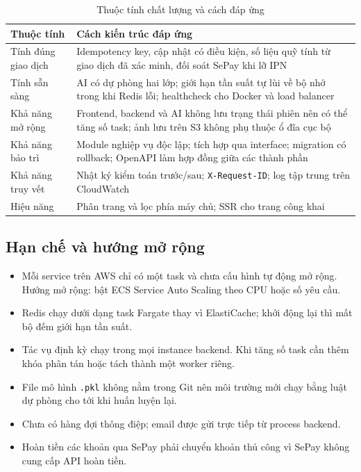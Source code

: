 \begin{table}[htbp]
    \centering
    \small
    \caption{Thuộc tính chất lượng và cách đáp ứng}
    \label{tab:chat_luong}
    \begin{tabularx}{\textwidth}{|P{3.4cm}|X|}
        \hline
        \textbf{Thuộc tính} & \textbf{Cách kiến trúc đáp ứng} \\
        \hline
        Tính đúng giao dịch & Idempotency key, cập nhật có điều kiện, số liệu quỹ tính từ giao dịch đã xác minh, đối soát SePay khi lỡ IPN \\
        \hline
        Tính sẵn sàng & AI có dự phòng hai lớp; giới hạn tần suất tự lùi về bộ nhớ trong khi Redis lỗi; healthcheck cho Docker và load balancer \\
        \hline
        Khả năng mở rộng & Frontend, backend và AI không lưu trạng thái phiên nên có thể tăng số task; ảnh lưu trên S3 không phụ thuộc ổ đĩa cục bộ \\
        \hline
        Khả năng bảo trì & Module nghiệp vụ độc lập; tích hợp qua interface; migration có rollback; OpenAPI làm hợp đồng giữa các thành phần \\
        \hline
        Khả năng truy vết & Nhật ký kiểm toán trước/sau; \texttt{X-Request-ID}; log tập trung trên CloudWatch \\
        \hline
        Hiệu năng & Phân trang và lọc phía máy chủ; SSR cho trang công khai \\
        \hline
    \end{tabularx}
\end{table}

\subsection{Hạn chế và hướng mở rộng}

\begin{itemize}
    \item Mỗi service trên AWS chỉ có một task và chưa cấu hình tự động mở rộng. Hướng mở rộng: bật ECS Service Auto Scaling theo CPU hoặc số yêu cầu.
    \item Redis chạy dưới dạng task Fargate thay vì ElastiCache; khởi động lại thì mất bộ đếm giới hạn tần suất.
    \item Tác vụ định kỳ chạy trong mọi instance backend. Khi tăng số task cần thêm khóa phân tán hoặc tách thành một worker riêng.
    \item File mô hình \texttt{.pkl} không nằm trong Git nên môi trường mới chạy bằng luật dự phòng cho tới khi huấn luyện lại.
    \item Chưa có hàng đợi thông điệp; email được gửi trực tiếp từ process backend.
    \item Hoàn tiền các khoản qua SePay phải chuyển khoản thủ công vì SePay không cung cấp API hoàn tiền.
\end{itemize}


